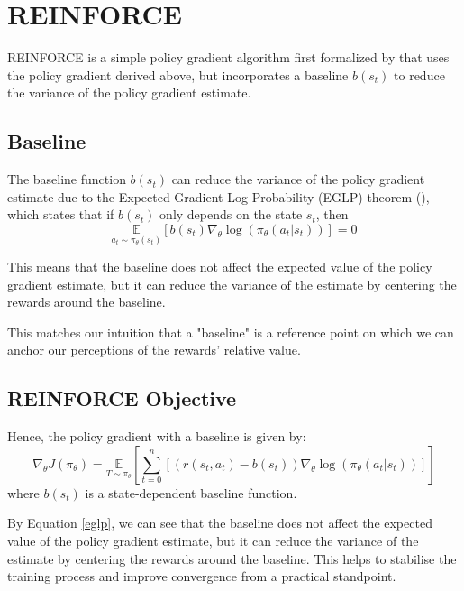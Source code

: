 \documentclass{article} %
\begin{document}
\section{REINFORCE}
REINFORCE is a simple policy gradient algorithm first formalized by \cite{Williams-1992} that uses the policy gradient derived above,
but incorporates a baseline $b(s_t)$ to reduce the variance of the policy gradient estimate.

\subsection{Baseline}
The baseline function $b(s_t)$ can reduce the variance of the policy gradient estimate
due to the Expected Gradient Log Probability (EGLP) theorem (\cite{SpinningUp-2018}), which states that
if $b(s_t)$ only depends on the state $s_t$, then
\begin{equation} \label{eglp}
    \underset{a_t \sim \pi_\theta(s_t)}{\mathbb{E}} \left[ b(s_t)\nabla_\theta \log(\pi_\theta(a_t | s_t)) \right] = 0
\end{equation}

This means that the baseline does not affect the expected value of the policy gradient estimate,
but it can reduce the variance of the estimate by centering the rewards around the baseline.

This matches our intuition that a "baseline" is a reference point on which we can anchor
our perceptions of the rewards' relative value.

\subsection{REINFORCE Objective}

Hence, the policy gradient with a baseline is given by:
\begin{equation} \label{policy_gradient_baseline}
    \nabla_\theta J(\pi_\theta) = \underset{T \sim \pi_\theta}{\mathbb{E}} \left[\sum_{t=0}^{n} \left[ (r(s_t, a_t) - b(s_t)) \nabla_\theta \log(\pi_\theta(a_t | s_t)) \right]\right]
\end{equation}
where $b(s_t)$ is a state-dependent baseline function.

By Equation \eqref{eglp}, we can see that the baseline does not affect the expected value of the policy gradient estimate,
but it can reduce the variance of the estimate by centering the rewards around the baseline.
This helps to stabilise the training process and improve convergence from a practical standpoint.
\end{document}
